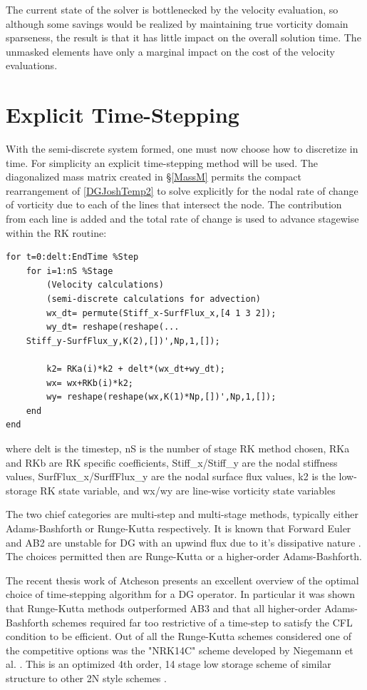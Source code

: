 \documentclass[letterpaper,12pt]{report}
\begin{document}
The current state of the solver is bottlenecked by the velocity evaluation, so although some savings would be realized by maintaining true vorticity domain sparseness, the result is that it has little impact on the overall solution time. The unmasked elements have only a marginal impact on the cost of the velocity evaluations.

%
\section{Explicit Time-Stepping}\label{TimeStep}
With the semi-discrete system formed, one must now choose how to discretize in time. For simplicity an explicit time-stepping method will be used. The diagonalized mass matrix created in \S\ref{MassM} permits the compact rearrangement of \eqref{DGJoshTemp2} to solve explicitly for the nodal rate of change of vorticity due to each of the lines that intersect the node. The contribution from each line is added and the total rate of change is used to advance stagewise within the RK routine:

\singlespacing
\begin{lstlisting}
for t=0:delt:EndTime %Step
    for i=1:nS %Stage
        (Velocity calculations)
        (semi-discrete calculations for advection)
        wx_dt= permute(Stiff_x-SurfFlux_x,[4 1 3 2]);
        wy_dt= reshape(reshape(...
	Stiff_y-SurfFlux_y,K(2),[])',Np,1,[]);
        
        k2= RKa(i)*k2 + delt*(wx_dt+wy_dt);
        wx= wx+RKb(i)*k2;
        wy= reshape(reshape(wx,K(1)*Np,[])',Np,1,[]);
    end
end
\end{lstlisting}
\doublespacing

where delt is the timestep, nS is the number of stage RK method chosen, RKa and RKb are RK specific coefficients, Stiff\_x/Stiff\_y are the nodal stiffness values, SurfFlux\_x/SurffFlux\_y are the nodal surface flux values, k2 is the low-storage RK state variable, and wx/wy are line-wise vorticity state variables

The two chief categories are multi-step and multi-stage methods, typically either Adams-Bashforth or Runge-Kutta respectively. It is known that Forward Euler and AB2 are unstable for DG with an upwind flux due to it's dissipative nature \cite{Reid}. The choices permitted then are Runge-Kutta or a higher-order Adams-Bashforth.

The recent thesis work of Atcheson \cite{Reid} presents an excellent overview of the optimal choice of time-stepping algorithm for a DG operator. In particular it was shown that Runge-Kutta methods outperformed AB3 and that all higher-order Adams-Bashforth schemes required far too restrictive of a time-step to satisfy the CFL condition to be efficient. Out of all the Runge-Kutta schemes considered \cite{Toulorge} one of the competitive options was the "NRK14C" scheme developed by Niegemann et al. \cite{Niegemann}. This is an optimized 4th order, 14 stage low storage scheme of similar structure to other 2N style schemes \cite{Carpenter}.
\end{document}
